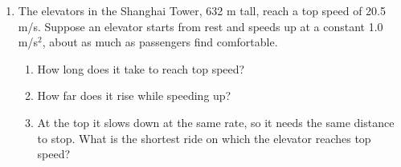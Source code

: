 \documentclass[12pt, twoside]{article}
\begin{document}
\begin{enumerate}[itemsep=0.5cm]
\item The elevators in the Shanghai Tower, 632 m tall, reach a top speed of
  20.5 m/s. Suppose an elevator starts from rest and speeds up at a constant
  1.0 m/s$^2$, about as much as passengers find comfortable.
  \begin{enumerate}[itemsep=0.4cm]
    \item How long does it take to reach top speed?
      \vspace{2.3cm}
    \item How far does it rise while speeding up?
      \vspace{2.8cm}
    \item At the top it slows down at the same rate, so it needs the same distance
      to stop. What is the shortest ride on which the elevator reaches top speed?
  \end{enumerate}

\end{enumerate}
\end{document}
